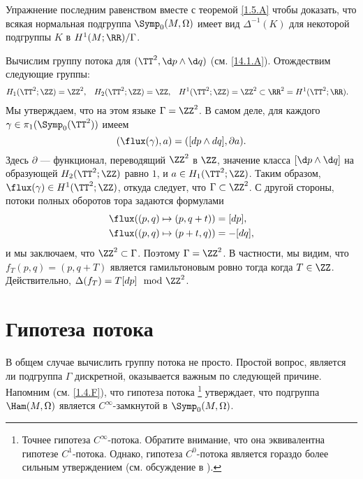 \begin{ex}{Упражнение}\label{14.1.B}
 последним равенством вместе с теоремой \ref{1.5.A} чтобы доказать, что всякая нормальная подгруппа $\Symp_0(M,\Omega)$ имеет вид $\Delta^{-1}(K)$ для некоторой подгруппы $K$ в $H^1(M;\RR)/\Gamma$.
\end{ex}

Вычислим группу потока для $(\TT^2,\d p\wedge \d q)$ (см. \ref{14.1.A}).
Отождествим следующие группы: 
\begin{align*}
H_1(\TT^2;\ZZ)&=\ZZ^2,
&
H_2(\TT^2;\ZZ)&=\ZZ,
&
H^1(\TT^2;\ZZ)&=\ZZ^2
\subset
\RR^2=
H^1(\TT^2;\RR).
\end{align*}
Мы утверждаем, что на этом языке $\Gamma = \ZZ^2$.
В самом деле, для каждого $\gamma\in\pi_1(\Symp_0(\TT^2))$ имеем 
\[(\flux(\gamma), a) = ([dp \wedge dq], \partial a).\]
Здесь $\partial$ — функционал, переводящий $\ZZ^2$ в $\ZZ$, значение
класса $[\d p \wedge \d q]$ на образующей $H_2 (\TT^2;\ZZ)$ равно $1$,
и $a \in H_1 (\TT^2;\ZZ)$.
Таким образом, $\flux(\gamma)\in H^1(\TT^2;\ZZ)$, откуда следует, что
$\Gamma\subset \ZZ^2$.
С другой стороны, потоки полных оборотов тора задаются формулами 
\begin{align*}
\flux( (p, q) \mapsto (p , q+ t))
&=
[dp],
\\
\flux( (p, q) \mapsto (p+ t , q))
&=
-[dq],
\end{align*}
и мы заключаем, что $\ZZ^2 \subset  \Gamma$.
Поэтому $\Gamma = \ZZ^2$.
В частности, мы видим, что $f_T(p, q) = (p, q + T)$ является
гамильтоновым ровно тогда когда $T \in \ZZ$. 
Действительно, $\Delta(f_T) = T[dp] \mod{\ZZ^2}$.

\section{Гипотеза потока}

В общем случае вычислить группу потока не просто. 
Простой вопрос, является ли подгруппа $\Gamma$ дискретной, оказывается важным по
следующей причине. 
Напомним (см. \ref{1.4.F}), что гипотеза потока%
\footnote{Точнее гипотеза $C^\infty$-потока.
Обратите внимание, что она эквивалентна гипотезе $C^1$-потока.
Однако, гипотеза $C^0$-потока является гораздо более сильным утверждением (см. обсуждение в \cite{LMP1}).}
утверждает, что подгруппа $\Ham(M,\Omega)$ является $C^\infty$-замкнутой в $\Symp_0(M,\Omega)$.

